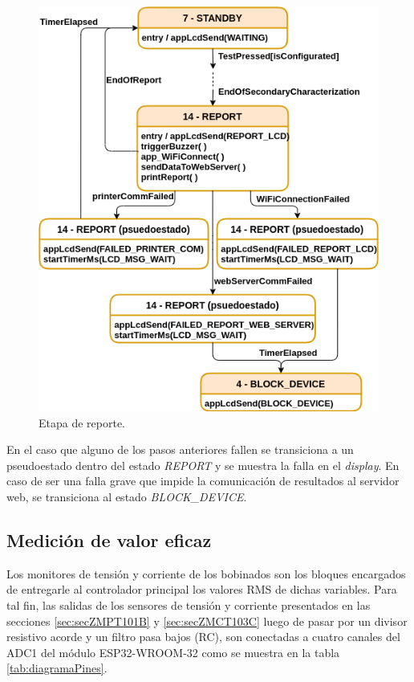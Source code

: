 \pagebreak

\begin{figure}[ht]
	\centering
	\includegraphics[scale=1]{./Figures/MainFSM_4.png}
	\caption{Etapa de reporte.}
	\label{fig:MainFSM_4}
\end{figure}

En el caso que alguno de los pasos anteriores fallen se transiciona a un pseudoestado dentro del estado \textit{REPORT} y se muestra la falla en el \textit{display}. En caso de ser una falla grave que impide la comunicación de resultados al servidor web, se transiciona al estado \textit{BLOCK\_DEVICE}.

\subsection{Medición de valor eficaz}
\label{subsec:RMS}

Los monitores de tensión y corriente de los bobinados son los bloques encargados de entregarle al controlador principal los valores RMS de dichas variables. Para tal fin, las salidas de los sensores de tensión y corriente presentados en las secciones \ref{sec:secZMPT101B} y \ref{sec:secZMCT103C} luego de pasar por un divisor resistivo acorde y un filtro pasa bajos (RC), son conectadas a cuatro canales del ADC1 del módulo ESP32-WROOM-32 como se muestra en la tabla \ref{tab:diagramaPines}.

